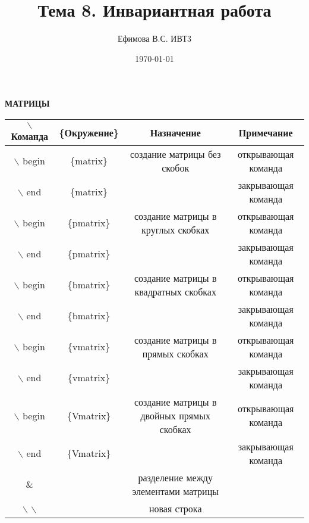 \documentclass[a4paper,12pt]{article} %
\author{Ефимова В.С. ИВТ3}
\title{Тема 8. Инвариантная работа}
\date{\today}
\begin{document}
\maketitle
\newpage
\begin{center}
\textbf{{\Huge МАТРИЦЫ}}
\begin{table}[h]
\begin{tabular}{|c c|c|c|}
\hline
$\backslash$ Команда & \{Окружение\} & Назначение & Примечание \\
\hline
$\backslash$ begin & \{matrix\} & создание матрицы без скобок & открывающая команда \\
$\backslash$ end & \{matrix\} &  & закрывающая команда \\
\hline
$\backslash$ begin & \{pmatrix\} & создание матрицы в круглых скобках & открывающая команда  \\
$\backslash$ end & \{pmatrix\} &  & закрывающая команда \\
\hline
$\backslash$ begin & \{bmatrix\} & создание матрицы в квадратных скобках & открывающая команда \\
$\backslash$ end & \{bmatrix\} &  & закрывающая команда \\
\hline
$\backslash$ begin & \{vmatrix\} & создание матрицы в прямых скобках & открывающая команда \\
$\backslash$ end & \{vmatrix\} &  & закрывающая команда \\
\hline
$\backslash$ begin & \{Vmatrix\} & создание матрицы в двойных прямых скобках & открывающая команда \\ 
$\backslash$ end & \{Vmatrix\} &  & закрывающая команда \\
\hline
\& &  & разделение между элементами матрицы&  \\
\hline
$\backslash$ $\backslash$ &  & новая строка &  \\
\hline
\end{tabular} 
\end{table}
\end{center}
\end{document}
